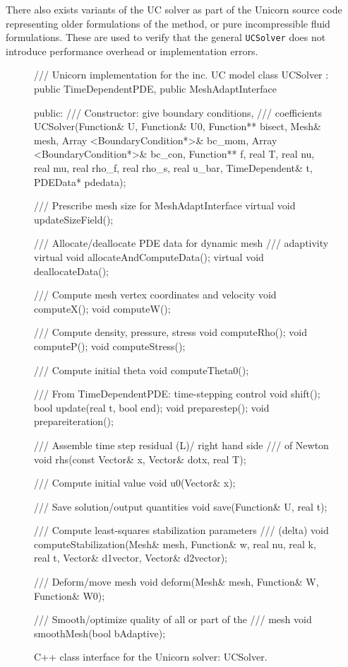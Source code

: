 There also exists variants of the UC solver as part of the Unicorn
source code representing older formulations of the method, or pure
incompressible fluid formulations. These are used to verify that the
general {\tt UCSolver} does not introduce performance overhead or
implementation errors.

\begin{figure}[!p]
\begin{c++}
/// Unicorn implementation for the inc. UC model
class UCSolver :
  public TimeDependentPDE, public MeshAdaptInterface
{
public:
  /// Constructor: give boundary conditions,
  /// coefficients
  UCSolver(Function& U, Function& U0,
           Function** bisect, Mesh& mesh,
           Array <BoundaryCondition*>& bc_mom,
           Array <BoundaryCondition*>& bc_con,
           Function** f, real T, real nu,
           real mu, real rho_f, real rho_s,
           real u_bar, TimeDependent& t,
           PDEData* pdedata);

  /// Prescribe mesh size for MeshAdaptInterface
  virtual void updateSizeField();

  /// Allocate/deallocate PDE data for dynamic mesh
  /// adaptivity
  virtual void allocateAndComputeData();
  virtual void deallocateData();

  /// Compute mesh vertex coordinates and velocity
  void computeX();
  void computeW();

  /// Compute density, pressure, stress
  void computeRho();
  void computeP();
  void computeStress();

  /// Compute initial theta
  void computeTheta0();

  /// From TimeDependentPDE: time-stepping control
  void shift();
  bool update(real t, bool end);
  void preparestep();
  void prepareiteration();

  /// Assemble time step residual (L)/ right hand side
  /// of Newton
  void rhs(const Vector& x, Vector& dotx, real T);

  /// Compute initial value
  void u0(Vector& x); 

  /// Save solution/output quantities
  void save(Function& U, real t); 

  /// Compute least-squares stabilization parameters
  /// (delta)
  void computeStabilization(Mesh& mesh, Function& w,
                            real nu, real k, real t,
                            Vector& d1vector,
                            Vector& d2vector);

  /// Deform/move mesh
  void deform(Mesh& mesh, Function& W, Function& W0);

  /// Smooth/optimize quality of all or part of the
  /// mesh
  void smoothMesh(bool bAdaptive);
}
\end{c++}
\caption{
C++ class interface for the Unicorn solver: UCSolver.
}
\label{code:UCSolver}
\end{figure}



